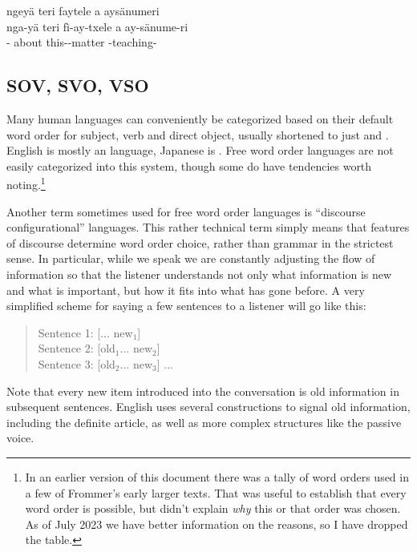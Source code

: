 \begin{interlin}
\glll ngeyä teri faytele a aysänumeri \\
   nga-yä teri fì-ay-txele a ay-sänume-ri \\
   - about this--matter  -teaching-\\
\end{interlin}

\subsection{SOV, SVO, VSO} Many human languages can conveniently be
categorized based on their default word order for subject, verb and
direct object, usually shortened to just  and .  English
is mostly an  language, Japanese is .  Free word order
languages are not easily categorized into this system, though some do
have tendencies worth noting.\footnote{In an earlier version of this
document there was a tally of word orders used in a few of Frommer's
early larger texts.  That was useful to establish that every word
order is possible, but didn't explain \textit{why} this or that order
was chosen.  As of July 2023 we have better information on the
reasons, so I have dropped the table.}

Another term sometimes used for free word order languages is
``discourse configurational'' languages.  This rather technical term
simply means that features of discourse determine word order choice,
rather than grammar in the strictest sense.  In particular, while we
speak we are constantly adjusting the flow of information so that the
listener understands not only what information is new and what is
important, but how it fits into what has gone before.  A very
simplified scheme for saying a few sentences to a listener will go
like this:

\begin{quotation}
\noindent Sentence 1: [... new$_1$]\\
Sentence 2: [old$_1$... new$_2$]\\
Sentence 3: [old$_2$... new$_3$] ...
\end{quotation}

\noindent Note that every new item introduced into the conversation
is old information in subsequent sentences.  English uses several
constructions to signal old information, including the definite
article,  as well as more complex structures like the passive
voice.


